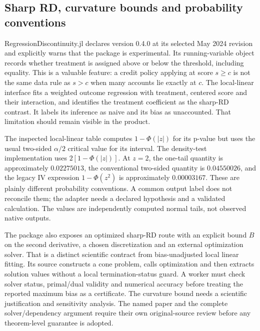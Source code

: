 \subsection{Sharp RD, curvature bounds and probability conventions}
\label{exec23:otheriv-sharp}
RegressionDiscontinuity.jl declares version 0.4.0 at its selected May 2024
revision and explicitly warns that the package is experimental. Its
running-variable object records whether treatment is assigned above or
below the threshold, including equality. This is a valuable feature: a
credit policy applying at score $s\geq c$ is not the same data rule as
$s>c$ when many accounts lie exactly at $c$. The local-linear interface
fits a weighted outcome regression with treatment, centered score and
their interaction, and identifies the treatment coefficient as the
sharp-RD contrast. It labels its inference as naive and its bias as
unaccounted. That limitation should remain visible in the product.
\citep{exec23_otheriv_source_1}

The inspected local-linear table computes $1-\Phi(|z|)$ for its p-value
but uses the usual two-sided $\alpha/2$ critical value for its interval.
The density-test implementation uses $2[1-\Phi(|z|)]$. At $z=2$, the
one-tail quantity is approximately $0.02275013$, the conventional
two-sided quantity is $0.04550026$, and the legacy IV expression
$1-\Phi(z^2)$ is approximately $0.00003167$. These are plainly different
probability conventions. A common output label does not reconcile them;
the adapter needs a declared hypothesis and a validated calculation.
The values are independently computed normal tails, not observed native
outputs. \citep{exec23_otheriv_source_1,exec23_otheriv_source_2,exec23_otheriv_reference}

The package also exposes an optimized sharp-RD route with an explicit
bound $B$ on the second derivative, a chosen discretization and an
external optimization solver. That is a distinct scientific contract
from bias-unadjusted local linear fitting. Its source constructs a
cone problem, calls optimization and then extracts solution values
without a local termination-status guard. A worker must check solver
status, primal/dual validity and numerical accuracy before treating the
reported maximum bias as a certificate. The curvature bound needs a
scientific justification and sensitivity analysis. The named paper and
the complete solver/dependency argument require their own original-source
review before any theorem-level guarantee is adopted.
\citep{exec23_otheriv_source_1}

